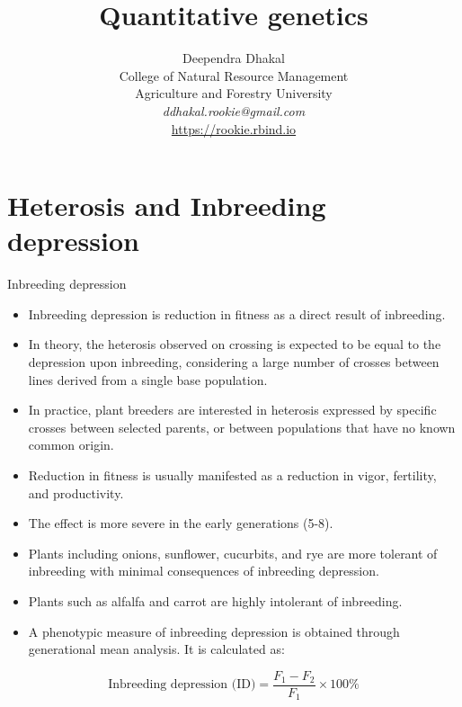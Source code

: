\documentclass[11pt,dvipsnames,ignorenonframetext,aspectratio=169]{beamer}
\title[]{Quantitative genetics}
\author[
        Deependra Dhakal\\
College of Natural Resource Management\\
Agriculture and Forestry University\\
\textit{ddhakal.rookie@gmail.com}\\
\url{https://rookie.rbind.io}
    ]{Deependra Dhakal\\
College of Natural Resource Management\\
Agriculture and Forestry University\\
\textit{ddhakal.rookie@gmail.com}\\
\url{https://rookie.rbind.io}}
\date[
      
  ]{
    }
\providecommand{\tightlist}{%
  \setlength{\itemsep}{0pt}\setlength{\parskip}{0pt}}
\begin{document}
  \begin{frame}[plain]
  \titlepage
  \end{frame}



\hypertarget{heterosis-and-inbreeding-depression}{%
\section{Heterosis and Inbreeding
depression}\label{heterosis-and-inbreeding-depression}}

\begin{frame}{Inbreeding depression}
\protect\hypertarget{inbreeding-depression}{}
\footnotesize

\begin{itemize}
\tightlist
\item
  Inbreeding depression is reduction in fitness as a direct result of
  inbreeding.
\item
  In theory, the heterosis observed on crossing is expected to be equal
  to the depression upon inbreeding, considering a large number of
  crosses between lines derived from a single base population.
\item
  In practice, plant breeders are interested in heterosis expressed by
  specific crosses between selected parents, or between populations that
  have no known common origin.
\item
  Reduction in fitness is usually manifested as a reduction in vigor,
  fertility, and productivity.
\item
  The effect is more severe in the early generations (5-8).
\item
  Plants including onions, sunflower, cucurbits, and rye are more
  tolerant of inbreeding with minimal consequences of inbreeding
  depression.
\item
  Plants such as alfalfa and carrot are highly intolerant of inbreeding.
\item
  A phenotypic measure of inbreeding depression is obtained through
  generational mean analysis. It is calculated as:
\end{itemize}

\[
\text{Inbreeding depression (ID)} = \frac{F_1 - F_2}{F_1} \times 100\%
\]
\end{frame}
\end{document}
